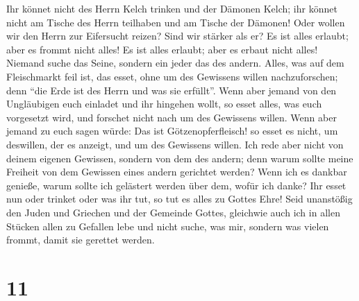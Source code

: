  Ihr könnet nicht des Herrn Kelch trinken und der Dämonen
Kelch; ihr könnet nicht am Tische des Herrn teilhaben und am Tische der
Dämonen!  Oder wollen wir den Herrn zur Eifersucht
reizen? Sind wir stärker als er?  Es ist alles erlaubt;
aber es frommt nicht alles! Es ist alles erlaubt; aber es erbaut nicht
alles!  Niemand suche das Seine, sondern ein jeder das
des andern.  Alles, was auf dem Fleischmarkt feil ist,
das esset, ohne um des Gewissens willen nachzuforschen; 
denn ``die Erde ist des Herrn und was sie erfüllt''. 
Wenn aber jemand von den Ungläubigen euch einladet und ihr hingehen
wollt, so esset alles, was euch vorgesetzt wird, und forschet nicht nach
um des Gewissens willen.  Wenn aber jemand zu euch sagen
würde: Das ist Götzenopferfleisch! so esset es nicht, um deswillen, der
es anzeigt, und um des Gewissens willen.  Ich rede aber
nicht von deinem eigenen Gewissen, sondern von dem des andern; denn
warum sollte meine Freiheit von dem Gewissen eines andern gerichtet
werden?  Wenn ich es dankbar genieße, warum sollte ich
gelästert werden über dem, wofür ich danke?  Ihr esset
nun oder trinket oder was ihr tut, so tut es alles zu Gottes Ehre!
 Seid unanstößig den Juden und Griechen und der Gemeinde
Gottes,  gleichwie auch ich in allen Stücken allen zu
Gefallen lebe und nicht suche, was mir, sondern was vielen frommt, damit
sie gerettet werden.

\hypertarget{section-10}{%
\section{11}\label{section-10}}

